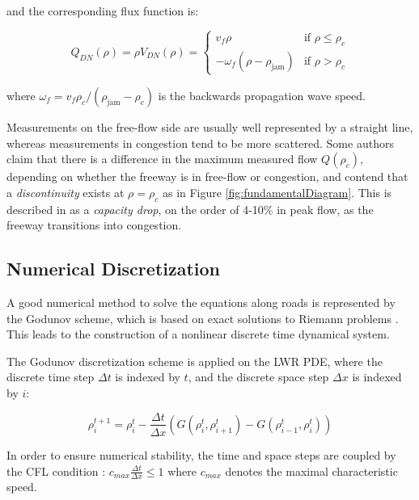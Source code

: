 \noindent and the corresponding flux function is:

\begin{equation}\label{eq:dnFlux}
Q_{DN}(\rho) = \rho V_{DN}(\rho) = \begin{cases}
v_{f} \rho & \text{if } \rho \leq \rho_{c} \\
-\omega_{f} \left( \rho - \rho_{\text{jam}} \right) & \text{if } \rho > \rho_{c}
\end{cases}
\end{equation}

\noindent where $\omega_{f}=v_{f}\rho_{c}/(\rho_{\text{jam}}-\rho_{c})$ is the backwards propagation wave speed.

Measurements on the free-flow side are usually well represented by a straight line, whereas measurements in congestion tend to be more scattered. Some authors claim that there is a difference in the maximum measured flow $Q(\rho_{c})$, depending on whether the freeway is in free-flow or congestion, and contend that a \textit{discontinuity} exists at $\rho=\rho_{c}$ as in Figure \ref{fig:fundamentalDiagram}. This is described in \cite{Agyemang-Duah1991,Cassidy1999,Hall1991} as a \textit{capacity drop}, on the order of 4-10\% in peak flow, as the freeway transitions into congestion.

\subsection{Numerical Discretization}

A good numerical method to solve the equations along roads is represented by the Godunov scheme, which is based on exact solutions to Riemann problems \cite{Godlewski1996,Godunov1959}. This leads to the construction of a nonlinear discrete time dynamical system.

The Godunov discretization scheme is applied on the LWR PDE, where the discrete time step $\Delta t$ is indexed by $t$, and the discrete space step $\Delta x$ is indexed by $i$:

\begin{equation} \label{eq:rhoGodunov}
\rho^{t+1}_{i} = \rho^{t}_{i} - \frac{\Delta t}{\Delta x}\left(G(\rho^{t}_{i},\rho^{t}_{i+1})-G(\rho^{t}_{i-1},\rho^{t}_{i})\right)
\end{equation}

\noindent In order to ensure numerical stability, the time and space steps are coupled by the CFL condition \cite{LeVeque1992}: $c_{max}\frac{\Delta t}{\Delta x} \leq 1$ where $c_{max}$ denotes the maximal characteristic speed.

